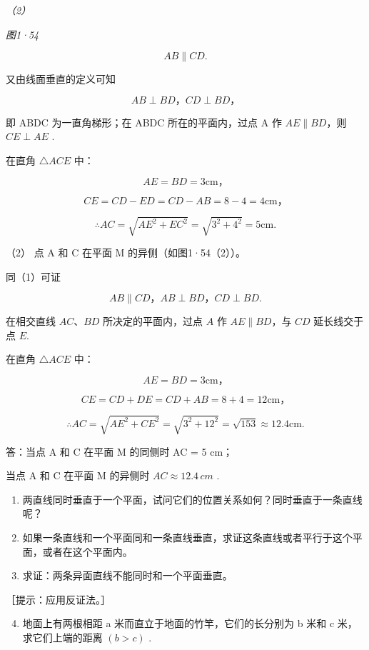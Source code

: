 \emph{（2）}

\emph{图1·54}

\[
A B \parallel C D.
\]

又由线面垂直的定义可知

\[
A B \perp B D\text{，} C D \perp B D\text{，}
\]

即 ABDC 为一直角梯形；在 ABDC 所在的平面内，过点 A 作
\(AE \parallel BD\)，则 \(CE \perp AE\) .

在直角 \(\triangle ACE\) 中：

\[
A E = B D = 3 \mathrm{cm}\text{，}
\]

\[
C E = C D - E D = C D - A B = 8 - 4 = 4 \mathrm{cm}\text{，}
\]

\[
\therefore A C = \sqrt {A E ^ {2} + E C ^ {2}} = \sqrt {3^{2} + 4^{2}} = 5 \mathrm{cm}.
\]

（2） 点 A 和 C 在平面 M 的异侧（如图1·54（2））。

同（1）可证

\[
A B \parallel C D\text{，} A B \perp B D\text{，} C D \perp B D.
\]

在相交直线 \(AC\)、\(BD\) 所决定的平面内，过点 \(A\) 作
\(AE \parallel BD\)，与 \(CD\) 延长线交于点 \(E\).

在直角 \(\triangle ACE\) 中：

\[
A E = B D = 3 \mathrm{cm}\text{，}
\]

\[
C E = C D + D E = C D + A B = 8 + 4 = 12 \mathrm{cm}\text{，}
\]

\[
\therefore A C = \sqrt {A E ^ {2} + C E ^ {2}} = \sqrt {3^{2} + 12^{2}} = \sqrt {153} \approx 12.4 \mathrm{cm}.
\]

答：当点 A 和 C 在平面 M 的同侧时 AC = 5 cm；

当点 A 和 C 在平面 M 的异侧时 \(AC \approx 12.4 \, cm\) .

\begin{enumerate}
\item
  两直线同时垂直于一个平面，试问它们的位置关系如何？同时垂直于一条直线呢？
\item
  如果一条直线和一个平面同和一条直线垂直，求证这条直线或者平行于这个平面，或者在这个平面内。
\item
  求证：两条异面直线不能同时和一个平面垂直。
\end{enumerate}

［提示：应用反证法。］

\begin{enumerate}
\setcounter{enumi}{3}
\item
  地面上有两根相距 a 米而直立于地面的竹竿，它们的长分别为 b 米和 c
  米，求它们上端的距离 \((b > c)\) .
\end{enumerate}

